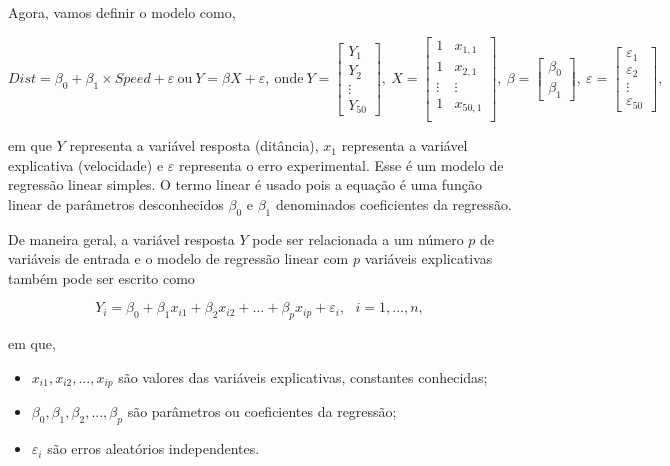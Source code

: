 \documentclass[
]{book}
\providecommand{\tightlist}{%
  \setlength{\itemsep}{0pt}\setlength{\parskip}{0pt}}
\begin{document}
Agora, vamos definir o modelo como,

\[Dist=\beta_0+\beta_1\times Speed+\varepsilon~\text{ou}~Y=\beta X+\varepsilon,~\text{onde}~Y = \left[\begin{array}{r}
Y_1       \\
Y_2    \\
\vdots \\
Y_{50}    \end{array}\right], ~ X = \left[\begin{array}{rr}
1 & x_{1,1} \\
1 & x_{2,1}  \\
\vdots & \vdots \\
1 & x_{{50},1} \\
\end{array}\right], ~ \beta = \left[\begin{array}{r}
\beta_0       \\
\beta_1\end{array}\right], ~ \varepsilon = \left[\begin{array}{r}
\varepsilon_1       \\
\varepsilon_2  \\
\vdots \\
\varepsilon_{50}\end{array}\right],\]

em que \(Y\) representa a variável resposta (ditância), \(x_1\) representa a variável explicativa (velocidade) e \(\varepsilon\) representa o erro experimental. Esse é um modelo de regressão linear simples. O termo linear é usado pois a equação é uma função linear de parâmetros desconhecidos \(\beta_0\) e \(\beta_1\) denominados coeficientes da regressão.

De maneira geral, a variável resposta \(Y\) pode ser relacionada a um número \(p\) de variáveis de entrada e o modelo de regressão linear com \(p\) variáveis explicativas também pode ser escrito como

\[Y_i=\beta_{0}+\beta_{1}x_{i1}+\beta_{2}x_{i2}+...+\beta_{p}x_{ip}+\varepsilon_i,~~~i=1,...,n,\]

em que,

\begin{itemize}
\tightlist
\item
  \(x_{i1},x_{i2},...,x_{ip}\) são valores das variáveis explicativas, constantes conhecidas;
\item
  \(\beta_{0},\beta_{1},\beta_{2},...,\beta_{p}\) são parâmetros ou coeficientes da regressão;
\item
  \(\varepsilon_i\) são erros aleatórios independentes.
\end{itemize}
\end{document}

